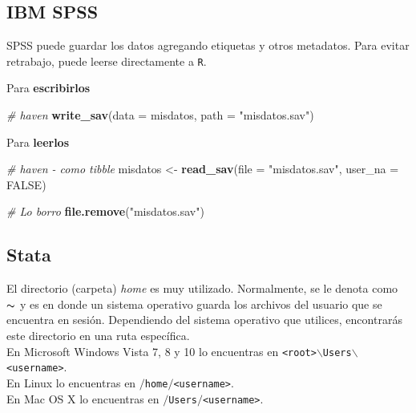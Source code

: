 \documentclass[]{article}
\newenvironment{Shaded}{\begin{snugshade}}{\end{snugshade}}
\newcommand{\KeywordTok}[1]{\textcolor[rgb]{0.13,0.29,0.53}{\textbf{#1}}}
\newcommand{\DataTypeTok}[1]{\textcolor[rgb]{0.13,0.29,0.53}{#1}}
\newcommand{\StringTok}[1]{\textcolor[rgb]{0.31,0.60,0.02}{#1}}
\newcommand{\CommentTok}[1]{\textcolor[rgb]{0.56,0.35,0.01}{\textit{#1}}}
\newcommand{\OtherTok}[1]{\textcolor[rgb]{0.56,0.35,0.01}{#1}}
\newcommand{\NormalTok}[1]{#1}
\begin{document}
\subsection{IBM SPSS}\label{ibm-spss}

SPSS puede guardar los datos agregando etiquetas y otros metadatos. Para
evitar retrabajo, puede leerse directamente a \texttt{R}.

Para \textbf{escribirlos}

\begin{Shaded}
\begin{Highlighting}[]
\CommentTok{# haven}
\KeywordTok{write_sav}\NormalTok{(}\DataTypeTok{data =}\NormalTok{ misdatos, }\DataTypeTok{path =} \StringTok{"misdatos.sav"}\NormalTok{)}
\end{Highlighting}
\end{Shaded}

Para \textbf{leerlos}

\begin{Shaded}
\begin{Highlighting}[]
\CommentTok{# haven - como tibble}
\NormalTok{misdatos <-}\StringTok{ }\KeywordTok{read_sav}\NormalTok{(}\DataTypeTok{file =} \StringTok{"misdatos.sav"}\NormalTok{, }\DataTypeTok{user_na =} \OtherTok{FALSE}\NormalTok{)}

\CommentTok{# Lo borro}
\KeywordTok{file.remove}\NormalTok{(}\StringTok{"misdatos.sav"}\NormalTok{)}
\end{Highlighting}
\end{Shaded}

\subsection{Stata}\label{stata}

\begin{curiosidad}
El directorio (carpeta) \textit{home} es muy utilizado. Normalmente, se le 
denota como $\thicksim$ y es en donde un sistema operativo guarda los 
archivos del usuario que se encuentra en sesión. Dependiendo del sistema
operativo que utilices, encontrarás este directorio en una ruta específica.\\

En Microsoft Windows Vista 7, 8 y 10 lo encuentras en \texttt{<root>$\backslash$Users$\backslash$<username>}.\\

En Linux lo encuentras en \texttt{$/$home$/$<username>}.\\

En Mac OS X lo encuentras en \texttt{$/$Users$/$<username>}.
\end{curiosidad}
\end{document}
